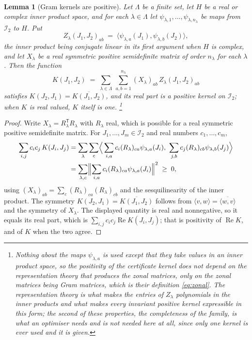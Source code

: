 \documentclass[11pt,reqno]{amsart}
\renewcommand{\_}{\origunderscore\allowbreak}
\numberwithin{equation}{section}
\theoremstyle{plain}
\newtheorem{lem}[thm]{Lemma}
\theoremstyle{definition}
\theoremstyle{remark}
\begin{document}
\begin{lem}[Gram kernels are positive]\label{lem:gram}
Let $\Lambda$ be a finite set, let $H$ be a real or complex inner product
space, and for each $\lambda\in\Lambda$ let
$\psi_{\lambda,1},\dots,\psi_{\lambda,n_\lambda}$ be maps from
$\mathcal I_2$ to $H$. Put
\[
  Z_\lambda(J_1,J_2)_{ab}\;=\;\bigl\langle\psi_{\lambda,a}(J_1),\psi_{\lambda,b}(J_2)\bigr\rangle ,
\]
the inner product being conjugate linear in its first argument when $H$
is complex, and let $X_\lambda$ be a real symmetric positive semidefinite
matrix of order $n_\lambda$ for each $\lambda$. Then the function
\[
  K(J_1,J_2)\;=\;\sum_{\lambda\in\Lambda}\ \sum_{a,b=1}^{n_\lambda}(X_\lambda)_{ab}\,Z_\lambda(J_1,J_2)_{ab}
\]
satisfies $K(J_2,J_1)=\overline{K(J_1,J_2)}$, and its real part is a
positive kernel on $\mathcal I_2$; when $K$ is real valued, $K$ itself is
one.%
\footnote{Nothing about the maps $\psi_{\lambda,a}$ is used except that
  they take values in an inner product space, so the positivity of the
  certificate kernel does not depend on the representation theory that
  produces the zonal matrices, only on the zonal matrices being Gram
  matrices, which is their definition \eqref{eq:zonal}. The
  representation theory is what makes the entries of $Z_\lambda$
  polynomials in the inner products and what makes every invariant
  positive kernel expressible in this form; the second of these
  properties, the completeness of the family, is what an optimiser
  needs and is not needed here at all, since only one kernel is ever
  used and it is given.}
\end{lem}

\begin{proof}
Write $X_\lambda=R_\lambda^{\mathsf T}R_\lambda$ with $R_\lambda$ real, which
is possible for a real symmetric positive semidefinite matrix. For
$J_1,\dots,J_m\in\mathcal I_2$ and real numbers $c_1,\dots,c_m$,
\begin{align*}
  \sum_{i,j}c_ic_j\,K(J_i,J_j)
  &=\sum_{\lambda}\sum_{c}\Bigl\langle\,\sum_{i,a}c_i(R_\lambda)_{ca}\psi_{\lambda,a}(J_i),\ 
  \sum_{j,b}c_j(R_\lambda)_{cb}\psi_{\lambda,b}(J_j)\Bigr\rangle\\
  &=\sum_{\lambda,c}\Bigl\|\sum_{i,a}c_i(R_\lambda)_{ca}\psi_{\lambda,a}(J_i)\Bigr\|^2\;\ge\;0 ,
\end{align*}
using $(X_\lambda)_{ab}=\sum_c(R_\lambda)_{ca}(R_\lambda)_{cb}$ and the
sesquilinearity of the inner product. The symmetry
$K(J_2,J_1)=\overline{K(J_1,J_2)}$ follows from
$\langle v,w\rangle=\overline{\langle w,v\rangle}$ and the symmetry of
$X_\lambda$. The displayed quantity is real and nonnegative, so it equals
its real part, which is $\sum_{i,j}c_ic_j\operatorname{Re}K(J_i,J_j)$; that
is positivity of $\operatorname{Re}K$, and of $K$ when the two agree.
\end{proof}
\end{document}
